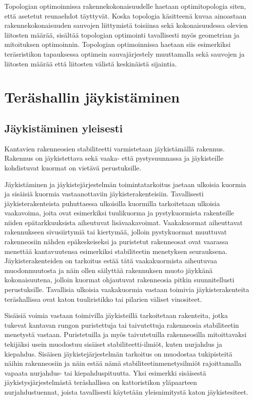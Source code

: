 \documentclass[12pt]{article}
\newenvironment{content}{\pagenumbering{arabic}}{}
\begin{document}
\begin{content}
Topologian optimoinnissa rakennekokonaisuudelle haetaan optimitopologia siten, että asetetut reunaehdot täyttyvät. Koska topologia käsitteenä kuvaa ainoastaan rakennekokonaisuuden sauvojen liittymistä toisiinsa sekä kokonaisuudessa olevien liitosten määrää, sisältää topologian optimointi tavallisesti myös geometrian ja mitoituksen optimoinnin. Topologian optimoinnissa haetaan siis esimerkiksi teräsristikon tapauksessa optimein sauvajärjestely muuttamalla sekä sauvojen ja liitosten määrää että liitosten välistä keskinäistä sijaintia. 






\section{Teräshallin jäykistäminen}

\subsection{Jäykistäminen yleisesti}

Kantavien rakenneosien stabiliteetti varmistetaan jäykistämällä rakennus. Rakennus on jäykistettava sekä vaaka- että pystysuunnassa ja jäykisteille kohdistuvat kuormat on vietävä perustuksille. 

Jäykistäminen ja jäykistejärjestelmän toimintatarkoitus jaetaan ulkoisia kuormia ja sisäisiä kuormia vastaanottaviin jäykisterakenteisiin. Tavallisesti jäykisterakenteista puhuttaessa ulkoisilla kuormilla tarkoitetaan ulkoisia vaakavoima, joita ovat esimerkiksi tuulikuorma ja pystykuormista rakenteille niiden epätarkkuuksista aiheutuvat lisävaakavoimat. Vaakakuormat aiheuttavat rakennukseen sivusiirtymiä tai kiertymää, jolloin pystykuormat muuttuvat rakenneosiin nähden epäkeskeiseksi ja puristetut rakenneosat ovat vaarassa menettää kantavuutensa esimerkiksi stabiliteetin menetyksen seurauksena. Jäykisterakenteiden on tarkoitus estää tätä vaakakuormista aiheutuvaa muodonmuutosta ja näin ollen säilyttää rakennuksen muoto jäykkänä kokonaisuutena, jolloin kuormat ohjautuvat rakenneosia pitkin suunnitellusti perustuksille. Tavallisia ulkoisia vaakakuormia vastaan toimivia jäykisterakenteita teräshallissa ovat katon tuuliristikko tai pilarien väliset vinositeet. 

Sisäisiä voimia vastaan toimivilla jäykisteillä tarkoitetaan rakenteita, jotka tukevat kantavan rungon puristettuja tai taivutettuja rakenneosia stabiliteetin menetystä vastaan. Puristetuilla ja myös taivutetuilla rakenneosilla mitoittavaksi tekijäksi usein muodostuu sisäiset stabiliteetti-ilmiöt, kuten nurjahdus ja kiepahdus. Sisäisen jäykistejärjestelmän tarkoitus on muodostaa tukipisteitä näihin rakenneosiin ja näin estää nämä stabiliteetinmenetysilmiöt rajoittamalla vapaata nurjahdus- tai kiepahduspituutta. Yksi esimerkki sisäisestä jäykistysjärjestelmästä teräshallissa on kattoristikon yläpaarteen nurjahdustuennat, joista tavallisesti käytetään yleisnimitystä katon jäykistesiteet. 




\end{content}
\end{document}
